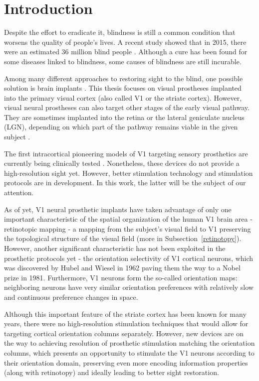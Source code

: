 \chapter*{Introduction}

Despite the effort to eradicate it, blindness is still a common condition that worsens the quality of people's lives. A recent study showed that in 2015, there were an estimated 36 million blind people \citep{ackland2017world}. Although a cure has been found for some diseases linked to blindness, some causes of blindness are still incurable.

Among many different approaches to restoring sight to the blind, one possible solution is brain implants \citep{kilgore_2015}. This thesis focuses on visual prostheses implanted into the primary visual cortex (also called V1 or the striate cortex). However, visual neural prostheses can also target other stages of the early visual pathway. They are sometimes implanted into the retina or the lateral geniculate nucleus (LGN), depending on which part of the pathway remains viable in the given subject \citep{mirochnik2019contemporary}.

The first intracortical pioneering models of V1 targeting sensory prosthetics are currently being clinically tested \citep{lewis2016electrical} \citep{fernandez2021visual}. Nonetheless, these devices do not provide a high-resolution sight yet. However, better stimulation technology and stimulation protocols are in development. In this work, the latter will be the subject of our attention. 

As of yet, V1 neural prosthetic implants have taken advantage of only one important characteristic of the spatial organization of the human V1 brain area - retinotopic mapping - a mapping from the subject’s visual field to V1 preserving the topological structure of the visual field (more in Subsection~\ref{retinotopy}). However, another significant characteristic has not been exploited in the prosthetic protocols yet - the orientation selectivity of V1 cortical neurons, which was discovered by Hubel and Wiesel in 1962 \citep{hubel1962receptive} paving them the way to a Nobel prize in 1981. Furthermore, V1 neurons form the so-called orientation maps: neighboring neurons have very similar orientation preferences with relatively slow and continuous preference changes in space.

Although this important feature of the striate cortex has been known for many years, there were no high-resolution stimulation techniques that would allow for targeting cortical orientation columns separately. However, new devices are on the way to achieving resolution of prosthetic stimulation matching the orientation columns, which presents an opportunity to stimulate the V1 neurons according to their orientation domain, preserving even more encoding information properties (along with retinotopy) and ideally leading to better sight restoration.

